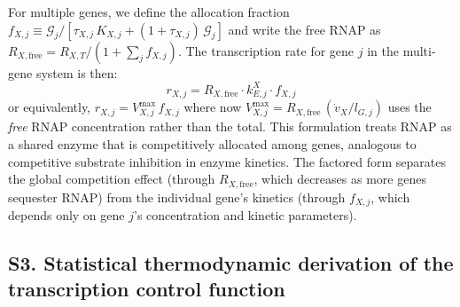 For multiple genes, we define the allocation fraction $f_{X,j} \equiv \mathcal{G}_j/[\tau_{X,j}\,K_{X,j} + (1 + \tau_{X,j})\,\mathcal{G}_j]$ and write the free RNAP as $R_{X,\text{free}} = R_{X,T}/(1 + \sum_j f_{X,j})$. The transcription rate for gene $j$ in the multi-gene system is then:
\begin{equation}
r_{X,j} = R_{X,\text{free}} \cdot k_{E,j}^X \cdot f_{X,j}
\label{eq:rX_with_f}
\end{equation}
or equivalently, $r_{X,j} = V_{X,j}^{\max}\,f_{X,j}$ where now $V_{X,j}^{\max} = R_{X,\text{free}}\,(\dot{v}_X / l_{G,j})$ uses the \textit{free} RNAP concentration rather than the total. This formulation treats RNAP as a shared enzyme that is competitively allocated among genes, analogous to competitive substrate inhibition in enzyme kinetics. The factored form separates the global competition effect (through $R_{X,\text{free}}$, which decreases as more genes sequester RNAP) from the individual gene's kinetics (through $f_{X,j}$, which depends only on gene $j$'s concentration and kinetic parameters).

\subsection*{S3. Statistical thermodynamic derivation of the transcription control function}

